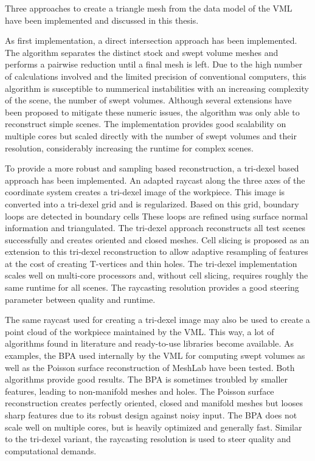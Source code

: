 Three approaches to create a triangle mesh from the data model of the VML have been implemented and discussed in this thesis.


As first implementation, a direct intersection approach has been implemented.
The algorithm separates the distinct stock and swept volume meshes and performs a pairwise reduction until a final mesh is left.
Due to the high number of calculations involved and the limited precision of conventional computers, this algorithm is susceptible to nummerical instabilities with an increasing complexity of the scene, \eg the number of swept volumes.
Although several extensions have been proposed to mitigate these numeric issues, the algorithm was only able to reconstruct simple scenes.
The implementation provides good scalability on multiple cores but scaled directly with the number of swept volumes and their resolution, considerably increasing the runtime for complex scenes.

To provide a more robust and sampling based reconstruction, a tri-dexel based approach has been implemented.
An adapted raycast along the three axes of the coordinate system creates a tri-dexel image of the workpiece.
This image is converted into a tri-dexel grid and is regularized.
Based on this grid, boundary loops are detected in boundary cells
These loops are refined using surface normal information and triangulated.
The tri-dexel approach reconstructs all test scenes successfully and creates oriented and closed meshes.
Cell slicing is proposed as an extension to this tri-dexel reconstruction to allow adaptive resampling of features at the cost of creating T-vertices and thin holes.
The tri-dexel implementation scales well on multi-core processors and, without cell slicing, requires roughly the same runtime for all scenes.
The raycasting resolution provides a good steering parameter between quality and runtime.

The same raycast used for creating a tri-dexel image may also be used to create a point cloud of the workpiece maintained by the VML.
This way, a lot of algorithms found in literature and ready-to-use libraries become available.
As examples, the BPA used internally by the VML for computing swept volumes as well as the Poisson surface reconstruction of MeshLab have been tested.
Both algorithms provide good results.
The BPA is sometimes troubled by smaller features, leading to non-manifold meshes and holes.
The Poisson surface reconstruction creates perfectly oriented, closed and manifold meshes but looses sharp features due to its robust design against noisy input.
The BPA does not scale well on multiple cores, but is heavily optimized and generally fast.
Similar to the tri-dexel variant, the raycasting resolution is used to steer quality and computational demands.


